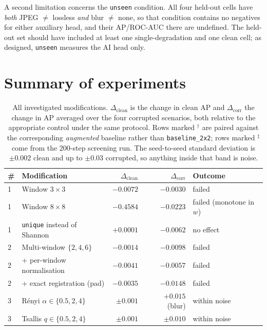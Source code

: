 A second limitation concerns the \texttt{unseen} condition. All four held-out
cells have \emph{both} JPEG $\neq$ lossless \emph{and} blur $\neq$ none, so that
condition contains no negatives for either auxiliary head, and their AP/ROC-AUC
there are undefined. The held-out set should have included at least one
single-degradation and one clean cell; as designed, \texttt{unseen} measures the
AI head only.

\section{Summary of experiments}
\label{sec:summary}

\begin{table}[t]
  \centering
  \caption{All investigated modifications. $\Delta_{\text{clean}}$ is the change
  in clean AP and $\Delta_{\text{corr}}$ the change in AP averaged over the four
  corrupted scenarios, both relative to the appropriate control under the same
  protocol. Rows marked $^\dagger$ are paired against the corresponding
  \emph{augmented} baseline rather than \texttt{baseline\_2x2}; rows marked
  $^\ddagger$ come from the 200-step screening run. The seed-to-seed standard
  deviation is $\pm0.002$ clean and up to $\pm0.03$ corrupted, so anything
  inside that band is noise.}
  \label{tab:summary}
  \small
  \begin{tabular}{llrrl}
    \toprule
    \# & Modification & $\Delta_{\text{clean}}$ & $\Delta_{\text{corr}}$ & Outcome \\
    \midrule
    1 & Window $3\times3$                        & $-0.0072$ & $-0.0030$ & failed \\
    1 & Window $8\times8$                        & $-0.4584$ & $-0.0223$ & failed (monotone in $w$) \\
    1 & \texttt{unique} instead of Shannon       & $+0.0001$ & $-0.0062$ & no effect \\
    \midrule
    2 & Multi-window $\{2,4,6\}$                 & $-0.0014$ & $-0.0098$ & failed \\
    2 & \quad + per-window normalisation         & $-0.0041$ & $-0.0057$ & failed \\
    2 & \quad + exact registration (pad)         & $-0.0035$ & $-0.0148$ & failed \\
    \midrule
    3 & Rényi $\alpha \in \{0.5,2,4\}$           & $\pm0.001$ & $+0.015$ (blur) & within noise \\
    3 & Tsallis $q \in \{0.5,2,4\}$              & $\pm0.001$ & $\pm0.010$ & within noise \\

\end{tabular}
\end{table}
